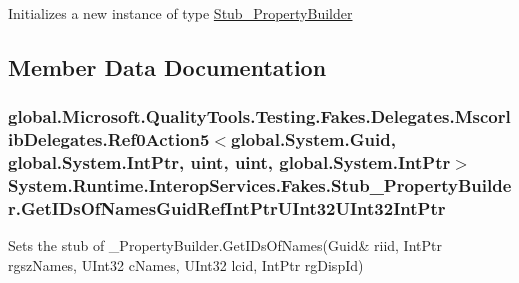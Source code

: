 Initializes a new instance of type \hyperlink{class_system_1_1_runtime_1_1_interop_services_1_1_fakes_1_1_stub___property_builder}{Stub\-\_\-\-Property\-Builder}



\subsection{Member Data Documentation}
\hypertarget{class_system_1_1_runtime_1_1_interop_services_1_1_fakes_1_1_stub___property_builder_ac66a5d5f4341f09b63a1f74d9d010b9b}{
\subsubsection[{Get\-I\-Ds\-Of\-Names\-Guid\-Ref\-Int\-Ptr\-U\-Int32\-U\-Int32\-Int\-Ptr}]{\setlength{\rightskip}{0pt plus 5cm}global.\-Microsoft.\-Quality\-Tools.\-Testing.\-Fakes.\-Delegates.\-Mscorlib\-Delegates.\-Ref0\-Action5$<$global.\-System.\-Guid, global.\-System.\-Int\-Ptr, uint, uint, global.\-System.\-Int\-Ptr$>$ System.\-Runtime.\-Interop\-Services.\-Fakes.\-Stub\-\_\-\-Property\-Builder.\-Get\-I\-Ds\-Of\-Names\-Guid\-Ref\-Int\-Ptr\-U\-Int32\-U\-Int32\-Int\-Ptr}}\label{class_system_1_1_runtime_1_1_interop_services_1_1_fakes_1_1_stub___property_builder_ac66a5d5f4341f09b63a1f74d9d010b9b}


Sets the stub of \-\_\-\-Property\-Builder.\-Get\-I\-Ds\-Of\-Names(Guid\& riid, Int\-Ptr rgsz\-Names, U\-Int32 c\-Names, U\-Int32 lcid, Int\-Ptr rg\-Disp\-Id)

